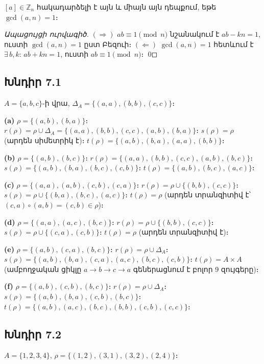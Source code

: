 $[a]\in\mathbb{Z}_n$ հակադարձելի է այն և միայն այն դեպքում, եթե $\gcd(a,n)=1$։

\emph{Ապացույցի ուրվագիծ.}
$(\Rightarrow)$ $ab\equiv 1\pmod{n}$ նշանակում է $ab - kn = 1$, ուստի $\gcd(a,n)=1$ ըստ Բեզուի։
$(\Leftarrow)$ $\gcd(a,n)=1$ հետևում է $\exists\,b,k$: $ab+kn=1$, ուստի $ab\equiv 1\pmod{n}$։ \qed


\subsection*{Խնդիր 7.1}

$A=\{a,b,c\}$-ի վրա, $\Delta_A=\{(a,a),(b,b),(c,c)\}$։

\textbf{(a)} $\rho=\{(a,b),(b,a)\}$։
$r(\rho)=\rho\cup\Delta_A=\{(a,a),(b,b),(c,c),(a,b),(b,a)\}$։
$s(\rho)=\rho$ (արդեն սիմետրիկ է)։
$t(\rho)=\{(a,b),(b,a),(a,a),(b,b)\}$։

\textbf{(b)} $\rho=\{(a,b),(b,c)\}$։
$r(\rho)=\{(a,a),(b,b),(c,c),(a,b),(b,c)\}$։
$s(\rho)=\{(a,b),(b,a),(b,c),(c,b)\}$։
$t(\rho)=\{(a,b),(b,c),(a,c)\}$։

\textbf{(c)} $\rho=\{(a,a),(a,b),(c,b),(c,a)\}$։
$r(\rho)=\rho\cup\{(b,b),(c,c)\}$։
$s(\rho)=\rho\cup\{(b,a),(b,c),(a,c)\}$։
$t(\rho)=\rho$ (արդեն տրանզիտիվ է՝ $(c,a)\circ(a,b)=(c,b)\in\rho$)։

\textbf{(d)} $\rho=\{(a,a),(a,c),(b,c)\}$։
$r(\rho)=\rho\cup\{(b,b),(c,c)\}$։
$s(\rho)=\rho\cup\{(c,a),(c,b)\}$։
$t(\rho)=\rho$ (արդեն տրանզիտիվ է)։

\textbf{(e)} $\rho=\{(a,b),(c,a),(b,c)\}$։
$r(\rho)=\rho\cup\Delta_A$։
$s(\rho)=\{(a,b),(b,a),(c,a),(a,c),(b,c),(c,b)\}$։
$t(\rho)=A\times A$ (ամբողջական ցիկլը $a\to b\to c\to a$ գեներացնում է բոլոր 9 զույգերը)։

\textbf{(f)} $\rho=\{(a,b),(c,b),(b,c)\}$։
$r(\rho)=\rho\cup\Delta_A$։
$s(\rho)=\{(a,b),(b,a),(c,b),(b,c)\}$։
$t(\rho)=\{(a,b),(a,c),(b,c),(b,b),(c,b),(c,c)\}$։


\subsection*{Խնդիր 7.2}

$A=\{1,2,3,4\}$, $\rho=\{(1,2),(3,1),(3,2),(2,4)\}$։

